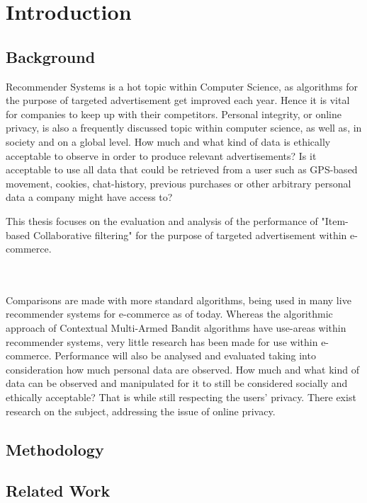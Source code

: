 \chapter{Introduction}

\section{Background}
Recommender Systems is a hot topic within Computer Science, as algorithms for the purpose of targeted advertisement get improved each year. Hence it is vital for companies to keep up with their competitors. Personal integrity, or online privacy, is also a frequently discussed topic within computer science, as well as, in society and on a global level. How much and what kind of data is ethically acceptable to observe in order to produce relevant advertisements? Is it acceptable to use all data that could be retrieved
from a user such as GPS-based movement, cookies, chat-history, previous purchases or other arbitrary personal data a company might have access to?

This thesis focuses on the evaluation and analysis of the performance of "Item-based Collaborative filtering" for the purpose of targeted advertisement within e-commerce.

\\\\Comparisons are made with more standard algorithms, being used in many live recommender systems for e-commerce as of today. Whereas the algorithmic approach of Contextual Multi-Armed Bandit algorithms have use-areas within recommender systems, very little research has been made for use within e-commerce. Performance will also be analysed and evaluated taking into consideration how much personal data are observed. How much and what kind of data can be observed and manipulated for it to still be considered socially and ethically acceptable? That is while still respecting the users’ privacy. There exist research on the subject, addressing the issue of online privacy.

\cite{park2012literature}

\section{Methodology}

\section{Related Work}

